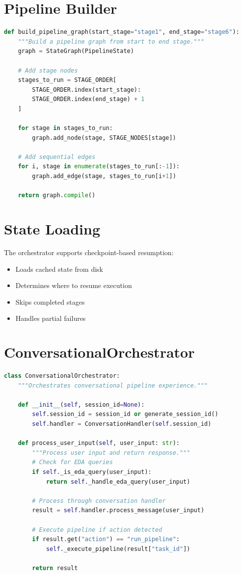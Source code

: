 \documentclass[12pt,a4paper]{report}
\begin{document}
\section{Pipeline Builder}
\begin{lstlisting}[language=Python]
def build_pipeline_graph(start_stage="stage1", end_stage="stage6"):
    """Build a pipeline graph from start to end stage."""
    graph = StateGraph(PipelineState)
    
    # Add stage nodes
    stages_to_run = STAGE_ORDER[
        STAGE_ORDER.index(start_stage):
        STAGE_ORDER.index(end_stage) + 1
    ]
    
    for stage in stages_to_run:
        graph.add_node(stage, STAGE_NODES[stage])
    
    # Add sequential edges
    for i, stage in enumerate(stages_to_run[:-1]):
        graph.add_edge(stage, stages_to_run[i+1])
    
    return graph.compile()
\end{lstlisting}

\section{State Loading}
The orchestrator supports checkpoint-based resumption:
\begin{itemize}
    \item Loads cached state from disk
    \item Determines where to resume execution
    \item Skips completed stages
    \item Handles partial failures
\end{itemize}

\section{ConversationalOrchestrator}
\begin{lstlisting}[language=Python]
class ConversationalOrchestrator:
    """Orchestrates conversational pipeline experience."""
    
    def __init__(self, session_id=None):
        self.session_id = session_id or generate_session_id()
        self.handler = ConversationHandler(self.session_id)
    
    def process_user_input(self, user_input: str):
        """Process user input and return response."""
        # Check for EDA queries
        if self._is_eda_query(user_input):
            return self._handle_eda_query(user_input)
        
        # Process through conversation handler
        result = self.handler.process_message(user_input)
        
        # Execute pipeline if action detected
        if result.get("action") == "run_pipeline":
            self._execute_pipeline(result["task_id"])
        
        return result
\end{lstlisting}
\end{document}
